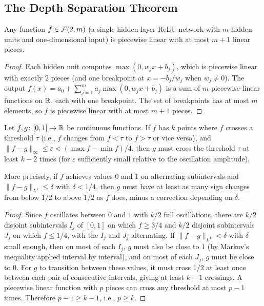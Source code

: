 \documentclass[11pt,a4paper]{article}
\begin{document}
\subsection{The Depth Separation Theorem}

\begin{lemma}
\label{lem:shallow-pieces}
Any function $f \in \mathcal{F}(2, m)$ (a single-hidden-layer ReLU network
with $m$ hidden units and one-dimensional input) is piecewise linear
with at most $m + 1$ linear pieces.
\end{lemma}

\begin{proof}
Each hidden unit computes $\max(0, w_j x + b_j)$, which is piecewise
linear with exactly $2$ pieces (and one breakpoint at $x = -b_j/w_j$
when $w_j \neq 0$).  The output $f(x) = a_0 + \sum_{j=1}^m a_j
\max(0, w_j x + b_j)$ is a sum of $m$ piecewise-linear functions
on $\mathbb{R}$, each with one breakpoint.  The set of breakpoints has at
most $m$ elements, so $f$ is piecewise linear with at most $m + 1$
pieces.
\end{proof}

\begin{lemma}
\label{lem:oscillation-bound}
Let $f, g \colon [0,1] \to \mathbb{R}$ be continuous functions.  If $f$ has $k$
points where $f$ crosses a threshold $\tau$ (i.e., $f$ changes from
$f < \tau$ to $f > \tau$ or vice versa), and $\|f - g\|_\infty \le
\varepsilon < (\max f - \min f)/4$, then $g$ must cross the threshold
$\tau$ at least $k - 2$ times (for $\varepsilon$ sufficiently small
relative to the oscillation amplitude).

More precisely, if $f$ achieves values $0$ and $1$ on alternating
subintervals and $\|f - g\|_{L^1} \le \delta$ with $\delta < 1/4$,
then $g$ must have at least as many sign changes from below $1/2$ to
above $1/2$ as $f$ does, minus a correction depending on $\delta$.
\end{lemma}

\begin{proof}
Since $f$ oscillates between $0$ and $1$ with $k/2$ full oscillations,
there are $k/2$ disjoint subintervals $I_j$ of $[0,1]$ on which
$f \ge 3/4$ and $k/2$ disjoint subintervals $J_j$ on which $f \le 1/4$,
with the $I_j$ and $J_j$ alternating.  If $\|f - g\|_{L^1} < \delta$
with $\delta$ small enough, then on most of each $I_j$, $g$ must also
be close to $1$ (by Markov's inequality applied interval by interval),
and on most of each $J_j$, $g$ must be close to $0$.  For $g$ to
transition between these values, it must cross $1/2$ at least once
between each pair of consecutive intervals, giving at least $k - 1$
crossings.  A piecewise linear function with $p$ pieces can cross any
threshold at most $p - 1$ times.  Therefore $p - 1 \ge k - 1$, i.e.,
$p \ge k$.
\end{proof}
\end{document}
